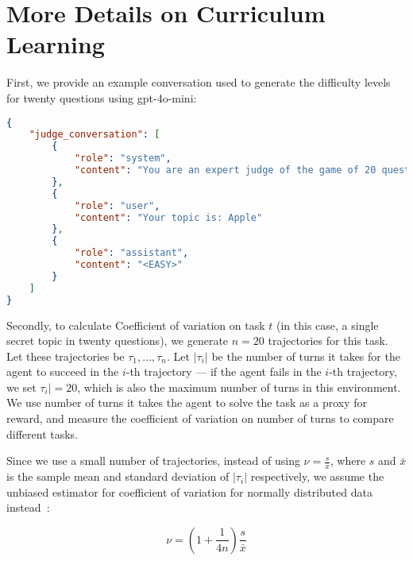\newpage

\section{More Details on Curriculum Learning} \label{appendix:curriculum}

First, we provide an example conversation used to generate the difficulty levels for twenty questions using gpt-4o-mini:

\begin{tcolorbox}[colback=gray!20, colframe=black, title=Twenty Questions Difficulty Generation]
\begin{lstlisting}[language=json, linewidth=0.99\textwidth, xleftmargin=10pt, xrightmargin=0pt]
{
    "judge_conversation": [
        {
            "role": "system",
            "content": "You are an expert judge of the game of 20 questions. I will give you a topic, and you must classify it into easy, medium or hard, based on an estimate of how easy it is to guess the topic, and an estimate of how many turns it will take to guess the topic. Respond in <EASY>, <MEDIUM> or <HARD>."
        },
        {
            "role": "user",
            "content": "Your topic is: Apple"
        },
        {
            "role": "assistant",
            "content": "<EASY>"
        }
    ]
}
\end{lstlisting}
\end{tcolorbox}

Secondly, to calculate Coefficient of variation on task $t$ (in this case, a single secret topic in twenty questions), we generate $n = 20$ trajectories for this task. Let these trajectories be $\tau_1, \ldots, \tau_n$. Let $|\tau_i|$ be the number of turns it takes for the agent to succeed in the $i$-th trajectory --- if the agent fails in the $i$-th trajectory, we set $\tau_i| = 20$, which is also the maximum number of turns in this environment. We use number of turns it takes the agent to solve the task as a proxy for reward, and measure the coefficient of variation on number of turns to compare different tasks.

Since we use a small number of trajectories, instead of using $\nu = \frac{s}{\bar{x}}$, where $s$ and $\bar{x}$ is the sample mean and standard deviation of $|\tau_i|$ respectively, we assume the unbiased estimator for coefficient of variation for normally distributed data instead~\citep{biometry2013Sokal}:

$$\nu = \left(1 + \frac{1}{4n}\right) \frac{s}{\bar{x}}$$

